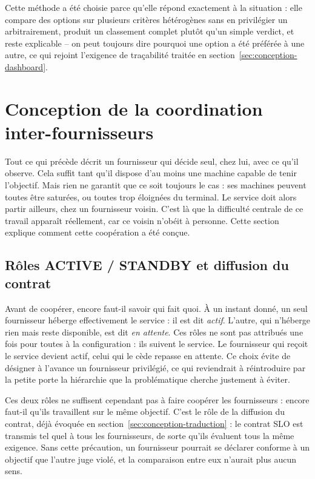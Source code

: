 Cette méthode a été choisie parce qu'elle répond exactement à la situation : elle compare des options sur plusieurs critères hétérogènes sans en privilégier un arbitrairement, produit un classement complet plutôt qu'un simple verdict, et reste explicable -- on peut toujours dire pourquoi une option a été préférée à une autre, ce qui rejoint l'exigence de traçabilité traitée en section~\ref{sec:conception-dashboard}.

\section{Conception de la coordination inter-fournisseurs}
\label{sec:conception-coordination}

Tout ce qui précède décrit un fournisseur qui décide seul, chez lui, avec ce qu'il observe. Cela suffit tant qu'il dispose d'au moins une machine capable de tenir l'objectif. Mais rien ne garantit que ce soit toujours le cas : ses machines peuvent toutes être saturées, ou toutes trop éloignées du terminal. Le service doit alors partir ailleurs, chez un fournisseur voisin. C'est là que la difficulté centrale de ce travail apparaît réellement, car ce voisin n'obéit à personne. Cette section explique comment cette coopération a été conçue.

\subsection{Rôles ACTIVE / STANDBY et diffusion du contrat}

Avant de coopérer, encore faut-il savoir qui fait quoi. À un instant donné, un seul fournisseur héberge effectivement le service : il est dit \emph{actif}. L'autre, qui n'héberge rien mais reste disponible, est dit \emph{en attente}. Ces rôles ne sont pas attribués une fois pour toutes à la configuration : ils suivent le service. Le fournisseur qui reçoit le service devient actif, celui qui le cède repasse en attente. Ce choix évite de désigner à l'avance un fournisseur privilégié, ce qui reviendrait à réintroduire par la petite porte la hiérarchie que la problématique cherche justement à éviter.

Ces deux rôles ne suffisent cependant pas à faire coopérer les fournisseurs : encore faut-il qu'ils travaillent sur le même objectif. C'est le rôle de la diffusion du contrat, déjà évoquée en section~\ref{sec:conception-traduction} : le contrat SLO est transmis tel quel à tous les fournisseurs, de sorte qu'ils évaluent tous la même exigence. Sans cette précaution, un fournisseur pourrait se déclarer conforme à un objectif que l'autre juge violé, et la comparaison entre eux n'aurait plus aucun sens.

